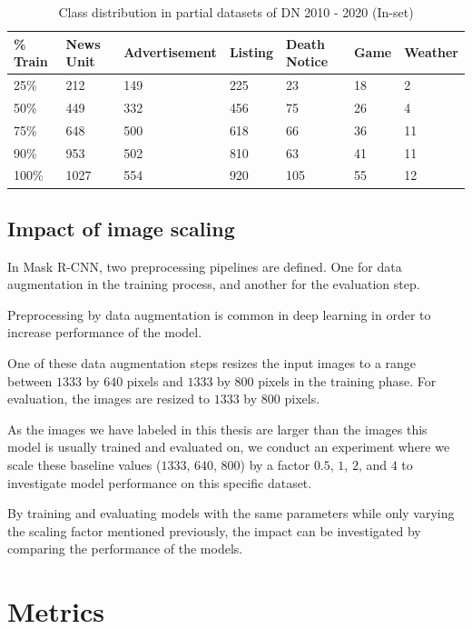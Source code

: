 \documentclass[oneside, english, bibtex]{kththesis}
\begin{document}
\begin{table}[H]
    \caption{Class distribution in partial datasets of DN 2010 - 2020 (In-set)}
    \label{tab:partialdist}
    \begin{tabular}{l|l|l|l|l|l|l} %
    \textbf{\% Train} & \textbf{News Unit} & \textbf{Advertisement} & \textbf{Listing} & \textbf{Death Notice} & \textbf{Game} & \textbf{Weather}  \\
    \hline
    25\% & 212 & 149 & 225 & 23 & 18 & 2 \\    \hline
    50\% & 449 & 332 & 456 & 75 & 26 & 4 \\    \hline
    75\% & 648 & 500 & 618 & 66 & 36 & 11 \\    \hline
    90\% & 953 & 502 & 810 & 63 & 41 & 11 \\    \hline
    100\% & 1027 & 554 & 920 & 105 & 55 & 12 \\    \hline
    \end{tabular}
\end{table}


\subsection{Impact of image scaling}

In Mask R-CNN, two preprocessing pipelines are defined. One for data augmentation in the training process, and another for the evaluation step.

Preprocessing by data augmentation is common in deep learning in order to increase performance of the model.

One of these data augmentation steps resizes the input images to a range between $1333$ by $640$ pixels and $1333$ by $800$ pixels in the training phase. For evaluation, the images are resized to $1333$ by $800$ pixels.

As the images we have labeled in this thesis are larger than the images this model is usually trained and evaluated on,
we conduct an experiment where we scale these baseline values ($1333$, $640$, $800$) by a factor $0.5$, $1$, $2$, and $4$ to investigate model performance on this specific dataset.

By training and evaluating models with the same parameters while only varying the scaling factor mentioned previously, the impact can be investigated by comparing the performance of the models.


\section{Metrics}
\end{document}

